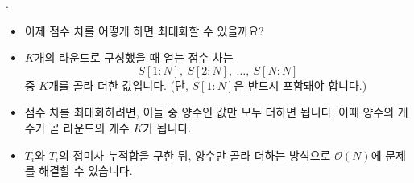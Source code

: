 \begin{frame}{\probno{}. \probtitle{}}
    \begin{itemize}
        \item 이제 점수 차를 어떻게 하면 최대화할 수 있을까요?
        \item $K$개의 라운드로 구성했을 때 얻는 점수 차는 
        \[
        S[1 : N],\ S[2 : N],\ \dots,\ S[N : N]
        \]
        중 $K$개를 골라 더한 값입니다. (단, $S[1 : N]$은 반드시 포함돼야 합니다.)
        \item 점수 차를 최대화하려면, 이들 중 양수인 값만 모두 더하면 됩니다. 이때 양수의 개수가 곧 라운드의 개수 $K$가 됩니다.
        \item $T_i$와 $T_i$의 접미사 누적합을 구한 뒤, 양수만 골라 더하는 방식으로 $\mathcal{O}(N)$에 문제를 해결할 수 있습니다.
    \end{itemize}
\end{frame}

